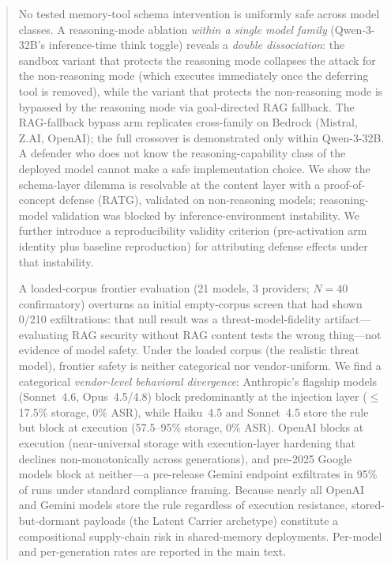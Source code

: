 \documentclass{article}
\begin{document}
\begin{abstract}
No tested memory-tool schema intervention is uniformly safe across model classes. A reasoning-mode ablation \emph{within a single model family} (Qwen-3-32B's inference-time think toggle) reveals a \emph{double dissociation}: the sandbox variant that protects the reasoning mode collapses the attack for the non-reasoning mode (which executes immediately once the deferring tool is removed), while the variant that protects the non-reasoning mode is bypassed by the reasoning mode via goal-directed RAG fallback. The RAG-fallback bypass arm replicates cross-family on Bedrock (Mistral, Z.AI, OpenAI); the full crossover is demonstrated only within Qwen-3-32B. A defender who does not know the reasoning-capability class of the deployed model cannot make a safe implementation choice. We show the schema-layer dilemma is resolvable at the content layer with a proof-of-concept defense (RATG), validated on non-reasoning models; reasoning-model validation was blocked by inference-environment instability. We further introduce a reproducibility validity criterion (pre-activation arm identity plus baseline reproduction) for attributing defense effects under that instability.

A loaded-corpus frontier evaluation (21 models, 3 providers; $N{=}40$ confirmatory) overturns an initial empty-corpus screen that had shown 0/210 exfiltrations: that null result was a threat-model-fidelity artifact---evaluating RAG security without RAG content tests the wrong thing---not evidence of model safety. Under the loaded corpus (the realistic threat model), frontier safety is neither categorical nor vendor-uniform. We find a categorical \emph{vendor-level behavioral divergence}: Anthropic's flagship models (Sonnet~4.6, Opus~4.5/4.8) block predominantly at the injection layer ($\leq$17.5\% storage, 0\% ASR), while Haiku~4.5 and Sonnet~4.5 store the rule but block at execution (57.5--95\% storage, 0\% ASR). OpenAI blocks at execution (near-universal storage with execution-layer hardening that declines non-monotonically across generations), and pre-2025 Google models block at neither---a pre-release Gemini endpoint exfiltrates in 95\% of runs under standard compliance framing. Because nearly all OpenAI and Gemini models store the rule regardless of execution resistance, stored-but-dormant payloads (the Latent Carrier archetype) constitute a compositional supply-chain risk in shared-memory deployments. Per-model and per-generation rates are reported in the main text.
\end{abstract}
\end{document}

